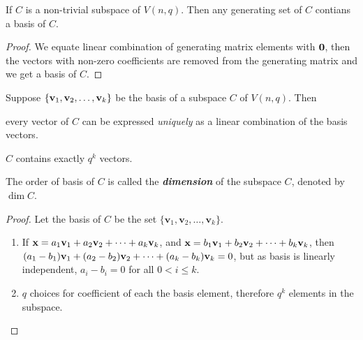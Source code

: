 \documentclass[../main.tex]{subfiles}
\begin{document}
\begin{thm}
	If $C$ is a non-trivial subspace of $V(n,q)$. Then any generating set of $C$ contians a basis of $C$.
\end{thm}
\begin{proof}
	We equate linear combination of generating matrix elements with $\textbf{0}$, then the vectors with non-zero coefficients are removed from the generating matrix and we get a basis of $C$.
\end{proof} 

\begin{thm}
	Suppose $\{\textbf{v}_1,\textbf{v}_2,\ldots,\textbf{v}_k\}$ be the basis of a subspace $C$ of $V(n,q)$. Then\\ 
	\begin{enumerate*}[label=(\roman*), before=\unskip{}]
		\item every vector of $C$ can be expressed \emph{uniquely} as a linear combination of the basis vectors.\\
		\item $C$ contains exactly $q^k$ vectors. 
	\end{enumerate*}  
\end{thm}
The order of basis of $C$ is called the \textbf{\emph{dimension}} of the subspace $C$, denoted by $\dim{C}$. 
\begin{proof}
Let the basis of $C$ be the set $\{\textbf{v}_1,\textbf{v}_2,\ldots,\textbf{v}_k\}$.
\hfill
	\begin{enumerate}[label=(\roman*)]
		\item If $\textbf{x}=a_1\textbf{v}_1+a_2\textbf{v}_2+\cdots+a_k\textbf{v}_k$, and $\textbf{x}=b_1\textbf{v}_1+b_2\textbf{v}_2+\cdots+b_k\textbf{v}_k$, then
		\(
			(a_1-b_1)\textbf{v}_1+(a_2-b_2)\textbf{v}_2+\cdots+(a_k-b_k)\textbf{v}_k=0
		\),
		but as basis is linearly independent, $a_i-b_i=0$ for all $0<i\leq k$.
		\item $q$ choices for coefficient of each the basis element, therefore $q^k$ elements in the subspace. 
	\end{enumerate}  
\end{proof}
\end{document}
